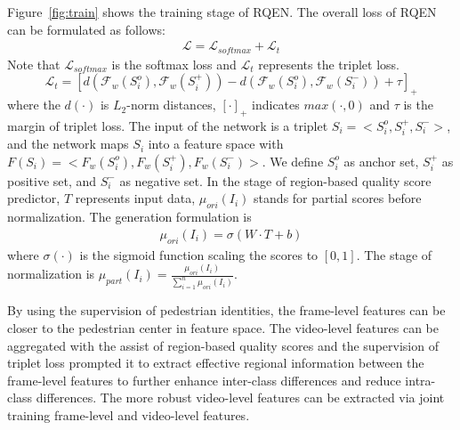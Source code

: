 \documentclass[letterpaper]{article} %
\begin{document}
Figure~\ref{fig:train} shows the training stage of RQEN.
The overall loss of RQEN can be formulated as follows:
\begin{eqnarray}
\mathcal{L} = \mathcal{L}_{softmax}+\mathcal{L}_{t}
\end{eqnarray}
Note that $\mathcal{L}_{softmax}$ is the softmax loss and $\mathcal{L}_{t}$ represents the triplet loss.
\begin{equation}
\mathcal{L}_{t}=[d(\mathcal{F}_w(S_i^o),\mathcal{F}_w(S_i^+))-d(\mathcal{F}_w(S_i^o),\mathcal{F}_w(S_i^-)) + \tau]_{+}
\end{equation}
where the $d(\cdot)$ is $L_2$-norm distances, $[\cdot]_{+}$ indicates $max(\cdot,0)$ and $\tau$ is the margin of triplet loss.
The input of the network is a triplet $S_i = < S_i^o,S_i^+,S_i^->$, and the network maps $S_i$ into a feature space with $F(S_i) = < F_w(S_i^o),F_w(S_i^+),F_w(S_i^-)>$.
We define $S_i^o$ as anchor set, $S_i^+$ as positive set, and $S_i^-$ as negative set.
In the stage of region-based quality score predictor, $T$ represents input data, $\mu_{ori}(I_i)$ stands for partial scores before normalization. The generation formulation is
\begin{eqnarray}
\mu_{ori}(I_i)=\sigma( W\cdot T + b)
\end{eqnarray}
where $\sigma(\cdot)$ is the sigmoid function scaling the scores to $[0,1]$. The stage of normalization is
$\mu_{part}(I_i)=\frac{\mu_{ori}(I_i)}{\sum_{i=1}^n\mu_{ori}(I_i)}$.

By using the supervision of pedestrian identities, the frame-level features can be closer to the pedestrian center in feature space. The video-level features can be aggregated with the assist of region-based quality scores and the supervision of triplet loss prompted it to extract effective regional information between the frame-level features to further enhance inter-class differences and reduce intra-class differences. The more robust video-level features can be extracted via joint training frame-level and video-level features.
\end{document}
